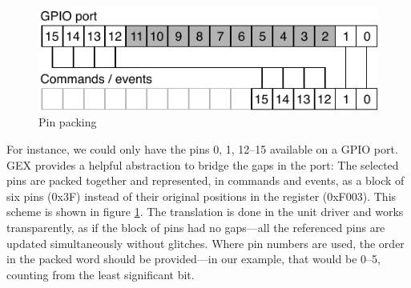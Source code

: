 \begin{figure}[h]
	\centering
	\includegraphics[scale=1] {img/pin-packing.pdf}
	\caption{\label{fig:pin-packing}Pin packing}
\end{figure}

For instance, we could only have the pins 0, 1, 12--15 available on a \gls{GPIO} port. GEX provides a helpful abstraction to bridge the gaps in the port: The selected pins are packed together and represented, in commands and events, as a block of six pins (0x3F) instead of their original positions in the register (0xF003). This scheme is shown in figure \ref{fig:pin-packing}. The translation is done in the unit driver and works transparently, as if the block of pins had no gaps---all the referenced pins are updated simultaneously without glitches. Where pin numbers are used, the order in the packed word should be provided---in our example, that would be 0--5, counting from the least significant bit.




















